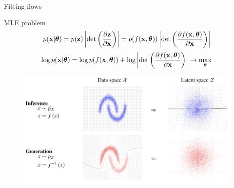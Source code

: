 \begin{frame}{Fitting flows}
	\begin{block}{MLE problem}
		\vspace{-0.3cm}
		\[
			p(\mathbf{x}|\boldsymbol{\theta}) = p(\mathbf{z}) \left|\det \left(  \frac{\partial \mathbf{z}}{\partial \mathbf{x}} \right) \right|  = p(f(\mathbf{x}, \boldsymbol{\theta})) \left|\det \left( \frac{\partial f(\mathbf{x}, \boldsymbol{\theta})}{\partial \mathbf{x}} \right) \right|
		\]
		\[
			\log p(\mathbf{x}|\boldsymbol{\theta}) = \log p(f(\mathbf{x}, \boldsymbol{\theta})) + \log  \left|\det \left( \frac{\partial f(\mathbf{x}, \boldsymbol{\theta})}{\partial \mathbf{x}} \right) \right| \rightarrow \max_{\boldsymbol{\theta}}
		\]
	\end{block}
	\vspace{-0.2cm}
	\begin{figure}
		\includegraphics[width=0.85\linewidth]{figs/flows_how2}
	\end{figure}
\end{frame}
